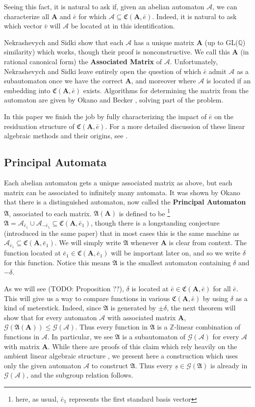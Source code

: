 \documentclass[final]{ws-ijac}
\newcommand{\A}{\mathcal{A}}
\newcommand{\G}{\mathcal{G}}
\renewcommand{\P}{\mathfrak{A}}
\newcommand{\C}{\mathfrak{C}(\Am,\e)}
\newcommand{\Z}{\mathbb{Z}}
\newcommand{\Q}{\mathbb{Q}}
\newcommand{\2}{\textbf{2}}
\newcommand{\Am}{\textbf{A}}
\newcommand{\vv}{\bar{v}}
\newcommand{\e}{\bar{e}}
\begin{document}
Seeing this fact, it is natural to ask if,
given an abelian automaton $\A$, we can characterize all $\Am$ and $\e$ for which 
$\A \subseteq \C$. Indeed, it is natural to ask which vector $\vv$ will $\A$
be located at in this identification. 

Nekrashevych and Sidki show that each $\A$ 
has a unique matrix $\Am$ (up to GL($\Q$) similarity) which works, though
their proof is nonconstructive. We call this $\Am$ (in rational canonical form)
the \textbf{Associated Matrix} of $\A$. Unfortunately, Nekrashevych and Sidki 
leave entirely open the question of which $\e$ admit $\A$ as a subautomaton
once we have the correct $\Am$, and moreover where $\A$ is located
if an embedding into $\C$ exists. Algorithms for determining the matrix from
the automaton are given by Okano \cite{Okano15:thesis} 
and Becker \cite{Becker18:thesis}, solving part of the problem. 

In this paper we finish the job by fully
characterizing the impact of $\e$ on the residuation structure of $\C$.
For a more detailed discussion of these linear algebraic methods and their 
origins, see %
\cite{Nekrashevych05:self_similar_groups,NekrashevychSidki04:automorphisms}.

\subsection{Principal Automata}
Each abelian automaton gets a unique associated matrix as above, but each
matrix can be associated to infinitely many automata.
It was shown by Okano \cite{Okano15:thesis} that there is a 
distinguished automaton, now called the \textbf{Principal Automaton} $\P$, 
associated to each matrix. $\P(\Am)$ is defined to be%
\footnote{here, as usual, $\e_1$ represents the first standard basis vector} 
$\P = \A_{\e_1} \cup \A_{-\e_1} \subseteq \mathfrak{C}(\Am, \e_1)$,
though there is a longstanding conjecture (introduced in the same paper) 
that in most cases this is the same machine as 
$\A_{\e_1} \subseteq \mathfrak{C}(\Am, \e_1)$. We will simply write $\P$ whenever $\Am$
is clear from context. The function located at $\e_1 \in \mathfrak{C}(\Am, \e_1)$ 
will be important later on, and so we write $\delta$ for this function. Notice this 
means $\P$ is the smallest automaton containing $\delta$ and $-\delta$.

As we will see (TODO: Proposition ??), $\delta$ is located at $\e \in \C$ for all $\e$. This will 
give us a way to compare functions in various $\C$ by using $\delta$ as a 
kind of meterstick. Indeed, since $\P$ is generated by $\pm \delta$, the
next theorem will show that for every automaton $\A$ with associated matrix $\Am$, 
$\G(\P(\Am)) \leq \G(\A)$. Thus every function in $\P$ is a $\Z$-linear 
combination of functions in $\A$. In particular, we see
$\P$ is a subautomaton of $\G(\A)$ for every $\A$ with matrix $\Am$.
While there are proofs of this claim which rely heavily on the
ambient linear algebraic structure \cite{Okano15:thesis}, 
we present here a construction which uses only the given 
automaton $\A$ to construct $\P$. Thus every $\underline{s} \in \G(\P)$ 
is already in $\G(\A)$, and the subgroup relation follows.
\end{document}
